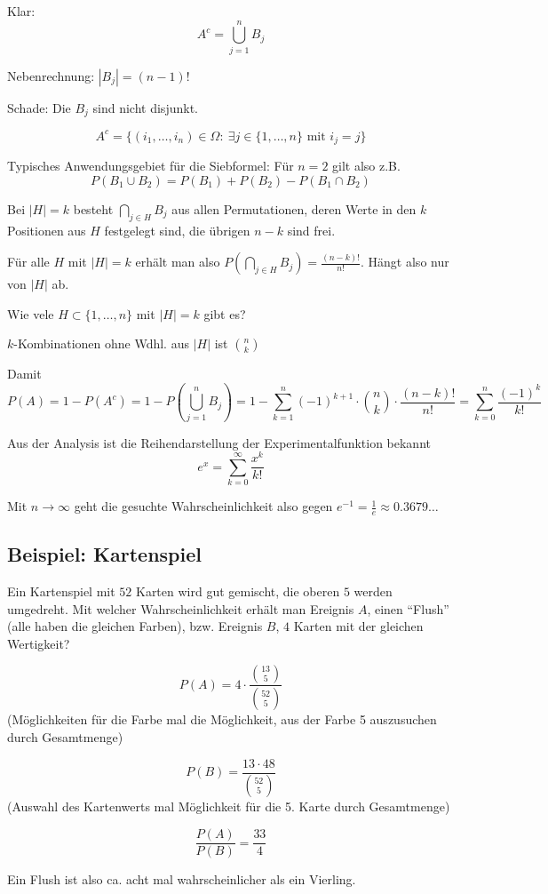 Klar: \[ A^c = \bigcup_{j=1}^n B_j \]

Nebenrechnung: $|B_j| = (n-1)!$

Schade: Die $B_j$ sind nicht disjunkt.


\[ A^c = \{ (i_1,\ldots,i_n) \in \Omega:\ \exists j \in \{1,\ldots, n\} \text{ mit } i_j=j \} \]

Typisches Anwendungsgebiet für die Siebformel: %
Für $n=2$ gilt also z.B.
\[ P(B_1 \cup B_2) = P(B_1) + P(B_2) - P(B_1\cap B_2) \]

Bei $|H| = k$ besteht $\bigcap_{j\in H}B_j$ aus allen Permutationen, deren Werte in den $k$ Positionen aus $H$ festgelegt sind, die übrigen $n-k$ sind frei.

Für alle $H$ mit $|H|=k$ erhält man also $P\left(\bigcap_{j\in H} B_j\right) = \frac{(n-k)!}{n!}$.
Hängt also nur von $|H|$ ab.

Wie vele $H \subset \{ 1,\ldots,n \}$ mit $|H|=k$ gibt es?

$k$-Kombinationen ohne Wdhl. aus $|H|$ ist $n \choose k$

Damit 
\[P(A) = 1- P(A^c) = 1-P\left(\bigcup_{j=1}^n B_j\right) = 1-\sum_{k=1}^n(-1)^{k+1} \cdot {n \choose k} \cdot \frac{(n-k)!}{n!} = \sum_{k=0}^n \frac{(-1)^k}{k!}\] %

Aus der Analysis ist die Reihendarstellung der Experimentalfunktion bekannt
\[e^x = \sum_{k=0}^\infty \frac{x^k}{k!}\]

Mit $n\rightarrow\infty$ geht die gesuchte Wahrscheinlichkeit also gegen $e^{-1} = \frac{1}{e} \approx 0.3679\ldots$

\subsection{Beispiel: Kartenspiel}

Ein Kartenspiel mit $52$ Karten wird gut gemischt, die oberen $5$ werden umgedreht.
Mit welcher Wahrscheinlichkeit erhält man Ereignis $A$, einen ``Flush'' (alle haben die gleichen Farben), bzw. Ereignis $B$, $4$ Karten mit der gleichen Wertigkeit?

\[P(A) = 4 \cdot \frac{{13 \choose 5}}{{52 \choose 5}} \] (Möglichkeiten für die Farbe mal die Möglichkeit, aus der Farbe 5 auszusuchen durch Gesamtmenge)

\[ P(B) = \frac{13 \cdot 48}{{52 \choose 5}} \]
(Auswahl des Kartenwerts mal Möglichkeit für die 5. Karte durch Gesamtmenge)

\[ \frac{P(A)}{P(B)} = \frac{33}{4} \]

Ein Flush ist also ca. acht mal wahrscheinlicher als ein Vierling.
